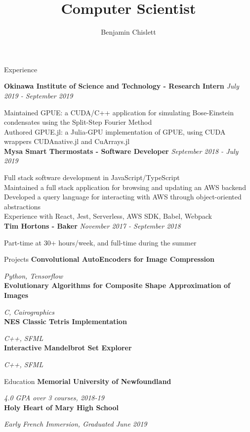 \documentclass[11pt, letterpaper]{article}
\title{Computer Scientist}
\author{Benjamin Chislett}
\date{}
\begin{document}
\begin{center}
  \Huge\theauthor
  \par
  \huge\thetitle
  \par
\end{center}

\begin{section}{Experience}

\textbf{Okinawa Institute of Science and Technology - Research Intern}
\hfill
\textit{July 2019 - September 2019}

Maintained GPUE: a CUDA/C++ application for simulating Bose-Einstein condensates using the Split-Step Fourier Method\\
Authored GPUE.jl: a Julia-GPU implementation of GPUE, using CUDA wrappers CUDAnative.jl and CuArrays.jl\\

\textbf{Mysa Smart Thermostats - Software Developer}
\hfill
\textit{September 2018 - July 2019}

Full stack software development in JavaScript/TypeScript\\
Maintained a full stack application for browsing and updating an AWS backend\\
Developed a query language for interacting with AWS through object-oriented abstractions\\
Experience with React, Jest, Serverless, AWS SDK, Babel, Webpack\\

\textbf{Tim Hortons - Baker}
\hfill
\textit{November 2017 - September 2018}

Part-time at 30+ hours/week, and full-time during the summer
\end{section}

\begin{section}{Projects}
\textbf{Convolutional AutoEncoders for Image Compression}

\textit{Python, Tensorflow}\\

\textbf{Evolutionary Algorithms for Composite Shape Approximation of Images}

\textit{C, Cairographics}\\

\textbf{NES Classic Tetris Implementation}

\textit{C++, SFML}\\

\textbf{Interactive Mandelbrot Set Explorer}

\textit{C++, SFML}
\end{section}

\begin{section}{Education}
\textbf{Memorial University of Newfoundland}

\textit{4.0 GPA over 3 courses, 2018-19}\\

\textbf{Holy Heart of Mary High School}

\textit{Early French Immersion, Graduated June 2019}
\end{section}
\end{document}
